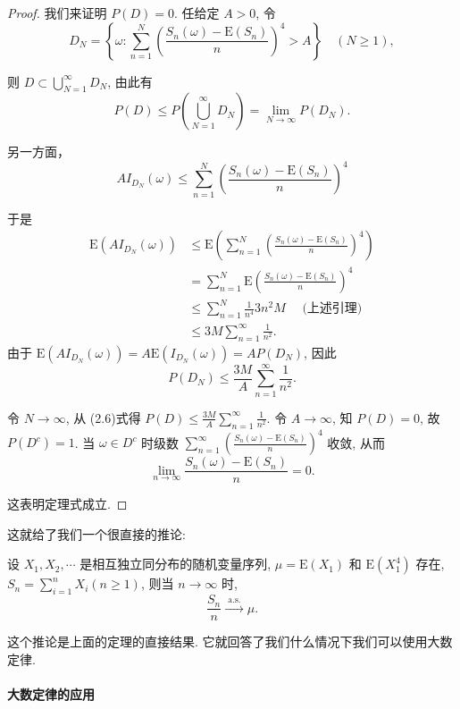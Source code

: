 {\begin{proof}
我们来证明 $P(D)=0$.
任给定 $A>0$, 令
$$
D_N=\left\{\omega: \sum_{n=1}^N\left(\frac{S_n(\omega)-\mathrm{E}\left(S_n\right)}{n}\right)^4>A\right\} \quad(N \geqslant 1),
$$

则 $D \subset \bigcup_{N=1}^{\infty} D_N$, 由此有
$$
P(D) \leqslant P\left(\bigcup_{N=1}^{\infty} D_N\right)=\lim _{N \rightarrow \infty} P\left(D_N\right) .
$$

另一方面，
$$
A I_{D_N}(\omega) \leqslant \sum_{n=1}^N\left(\frac{S_n(\omega)-\mathrm{E}\left(S_n\right)}{n}\right)^4
$$

于是
$$
\begin{aligned}
\mathrm{E}\left(A I_{D_N}(\omega)\right) & \leqslant \mathrm{E}\left(\sum_{n=1}^N\left(\frac{S_n(\omega)-\mathrm{E}\left(S_n\right)}{n}\right)^4\right) \\
& =\sum_{n=1}^N \mathrm{E}\left(\frac{S_n(\omega)-\mathrm{E}\left(S_n\right)}{n}\right)^4 \\
& \leqslant \sum_{n=1}^N \frac{1}{n^4} 3 n^2 M \quad\text { (上述引理) } \\
& \leqslant 3 M \sum_{n=1}^{\infty} \frac{1}{n^2} .
\end{aligned}
$$
由于 $\mathrm{E}\left(A I_{D_N}(\omega)\right)=A \mathrm{E}\left(I_{D_N}(\omega)\right)=A P\left(D_N\right)$, 因此
$$
P\left(D_N\right) \leqslant \frac{3 M}{A} \sum_{n=1}^{\infty} \frac{1}{n^2} .
$$

令 $N \rightarrow \infty$, 从 (2.6)式得 $P(D) \leqslant \frac{3 M}{A} \sum_{n=1}^{\infty} \frac{1}{n^2}$. 令 $A \rightarrow \infty$, 知 $P(D)=0$, 故
$P\left(D^c\right)=1$. 当 $\omega \in D^c$ 时级数 $\sum_{n=1}^{\infty}\left(\frac{S_n(\omega)-\mathrm{E}\left(S_n\right)}{n}\right)^4$ 收敛, 从而
$$
\lim _{n \rightarrow \infty} \frac{S_n(\omega)-\mathrm{E}\left(S_n\right)}{n}=0 .
$$

这表明定理式成立.
\end{proof}
}

这就给了我们一个很直接的推论: 
\begin{corollary}
    设 $X_1, X_2, \cdots$ 是相互独立同分布的随机变量序列, $\mu=\mathrm{E}\left(X_1\right)$ 和 $\mathrm{E}\left(X_1^4\right)$ 存在, $S_n=\sum_{i=1}^n X_i(n \geqslant 1)$, 则当 $n \rightarrow \infty$ 时,
$$
\frac{S_n}{n} \stackrel{\text { a.s. }}{\longrightarrow} \mu .
$$
\end{corollary}

这个推论是上面的定理的直接结果. 它就回答了我们什么情况下我们可以使用大数定律. 

\paragraph{大数定律的应用}

